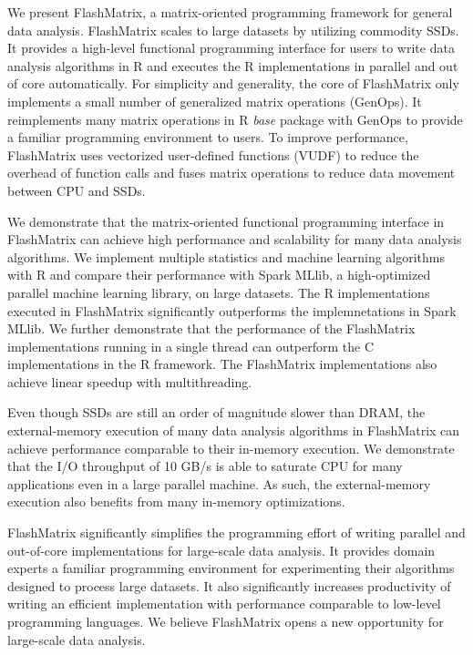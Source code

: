 We present FlashMatrix, a matrix-oriented programming framework for general
data analysis. FlashMatrix scales to large datasets by utilizing commodity SSDs.
It provides a high-level functional programming interface for users to write
data analysis algorithms in R and
executes the R implementations in parallel and out of core automatically.
For simplicity and generality, the core of FlashMatrix only implements
a small number of generalized matrix operations (GenOps). It reimplements
many matrix operations in R \textit{base} package with GenOps to provide
a familiar programming environment to users. To improve performance,
FlashMatrix uses vectorized user-defined functions (VUDF) to reduce the
overhead of function calls and fuses matrix operations to reduce data movement
between CPU and SSDs.

We demonstrate that the matrix-oriented functional programming interface in
FlashMatrix can achieve high performance and scalability for many data analysis
algorithms. We implement multiple statistics and
machine learning algorithms with R and compare their performance with Spark
MLlib, a high-optimized parallel machine learning library, on large datasets.
The R implementations executed in FlashMatrix significantly outperforms
the implemnetations in Spark MLlib. We further demonstrate that the performance
of the FlashMatrix implementations running in a single thread can outperform
the C implementations in the R framework. The FlashMatrix implementations
also achieve linear speedup with multithreading.

Even though SSDs are still an order of magnitude slower than DRAM, the external-memory
execution of many data analysis algorithms in FlashMatrix can achieve performance
comparable to their in-memory execution. We demonstrate that the I/O throughput
of 10 GB/s is able to saturate CPU for many applications even in a large parallel
machine. As such, the external-memory execution also benefits from many in-memory
optimizations.

FlashMatrix significantly simplifies the programming effort of writing
parallel and out-of-core implementations for large-scale data analysis. It
provides domain experts a familiar programming environment for experimenting
their algorithms designed to process large datasets. It also significantly
increases productivity of writing an efficient implementation with performance
comparable to low-level programming languages. We believe FlashMatrix opens
a new opportunity for large-scale data analysis.

